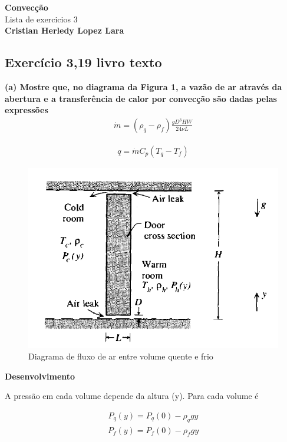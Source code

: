 \documentclass[12pt]{article}
\title{}
\author{}
\begin{document}
\begin{center}
	{\tiny {\normalsize {\large \textbf{Convecção}\\ Lista de exercicios 3\\
	
	\textbf{Cristian Herledy Lopez Lara}}}}
\end{center}

\subsection*{Exercício 3,19 livro texto}


\textbf{(a) Mostre que, no diagrama da Figura 1, a vazão de ar através da abertura e a transferência de calor por convecção são dadas pelas expressões}\\

\begin{equation}
	\begin{aligned}
		\dot{m} = (\rho _{q} - \rho _{f}) \frac{g D^{3} HW}{24\nu L} 
	\end{aligned}
\end{equation}

\begin{equation}
	\begin{aligned}
		q = \dot{m} C_{p} (T_{q} - T_{f})
	\end{aligned}
\end{equation}

\begin{figure}[H]
	\centering
	\includegraphics[width=.65\textwidth]{Figures/1_1}
	\caption{Diagrama de fluxo de ar entre volume quente e frio}
\end{figure}


\textbf{Desenvolvimento} 

A pressão em cada volume depende da altura (y). Para cada volume é

\begin{equation}
	\begin{aligned}
		P_{q}(y) = P_{q}(0) - \rho _{q}gy
	\end{aligned}
\end{equation}
\begin{equation}
	\begin{aligned}
		P_{f}(y) = P_{f}(0) - \rho _{f}gy
	\end{aligned}
\end{equation}
\end{document}
